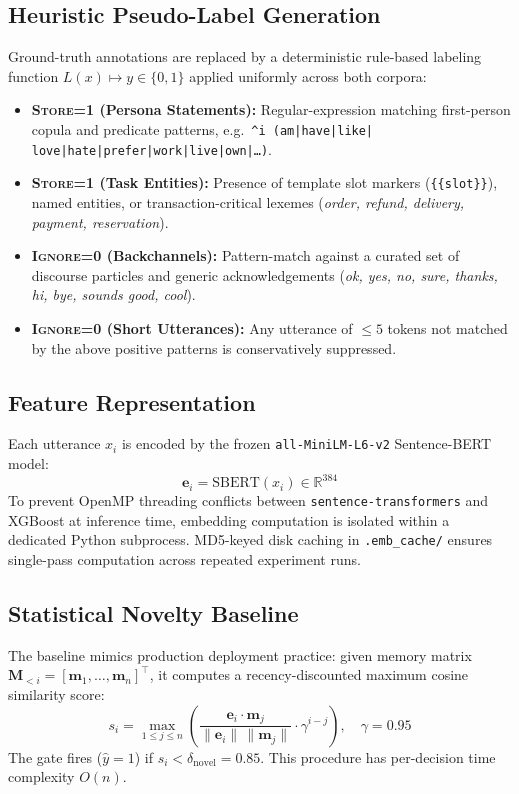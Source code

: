 \documentclass[conference]{IEEEtran}
\begin{document}
\subsection{Heuristic Pseudo-Label Generation}
Ground-truth annotations are replaced by a deterministic
rule-based labeling function $L(x) \mapsto y \in \{0,1\}$
applied uniformly across both corpora:

\begin{itemize}
  \item \textbf{\textsc{Store}=1 (Persona Statements):}
    Regular-expression matching first-person copula and
    predicate patterns, e.g.~\texttt{\^{}i\,(am|have|like|
    love|hate|prefer|work|live|own|\ldots)}.

  \item \textbf{\textsc{Store}=1 (Task Entities):}
    Presence of template slot markers
    (\texttt{\{\{slot\}\}}), named entities, or
    transaction-critical lexemes
    (\emph{order, refund, delivery, payment, reservation}).

  \item \textbf{\textsc{Ignore}=0 (Backchannels):}
    Pattern-match against a curated set of discourse
    particles and generic acknowledgements
    (\emph{ok, yes, no, sure, thanks, hi, bye,
    sounds good, cool}).

  \item \textbf{\textsc{Ignore}=0 (Short Utterances):}
    Any utterance of $\leq 5$ tokens not matched by the
    above positive patterns is conservatively suppressed.
\end{itemize}

\subsection{Feature Representation}
Each utterance $x_i$ is encoded by the frozen
\texttt{all-MiniLM-L6-v2} Sentence-BERT model:
\begin{equation}
  \mathbf{e}_i = \mathrm{SBERT}(x_i) \in \mathbb{R}^{384}
\end{equation}
To prevent OpenMP threading conflicts between
\texttt{sentence-transformers} and XGBoost at inference time,
embedding computation is isolated within a dedicated Python
subprocess.
MD5-keyed disk caching in \texttt{.emb\_cache/} ensures
single-pass computation across repeated experiment runs.

\subsection{Statistical Novelty Baseline}
The baseline mimics production deployment practice: given
memory matrix $\mathbf{M}_{<i} = [\mathbf{m}_1, \ldots,
\mathbf{m}_n]^\top$, it computes a recency-discounted
maximum cosine similarity score:
\begin{equation}
  s_i = \max_{1 \leq j \leq n}
    \left(\frac{\mathbf{e}_i \cdot \mathbf{m}_j}
               {\|\mathbf{e}_i\|\,\|\mathbf{m}_j\|}
    \cdot \gamma^{i-j}\right),\quad \gamma = 0.95
\end{equation}
The gate fires ($\hat{y}{=}1$) if
$s_i < \delta_{\mathrm{novel}} = 0.85$.
This procedure has per-decision time complexity $O(n)$.
\end{document}
